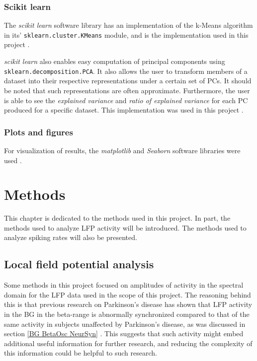 \documentclass{kththesis}
\begin{document}
\subsection{Scikit learn}\label{SK BG}

The \textit{scikit learn} software library has an implementation of the k-Means algorithm in its' \texttt{sklearn.cluster.KMeans} module, and is the implementation used in this project \parencite{SKLEARN}.

\textit{scikit learn} also enables easy computation of principal components using \texttt{sklearn.decomposition.PCA}.
It also allows the user to transform members of a dataset into their respective representations under a certain set of PCs. 
It should be noted that such representations are often approximate.
Furthermore, the user is able to see the \textit{explained variance} and \textit{ratio of explained variance} for each PC produced for a specific dataset. 
This implementation was used in this project \parencite{SKLEARN}.

\subsection{Plots and figures}

For visualization of results, the \textit{matplotlib} and \textit{Seaborn} software libraries were used \parencite{MPL} \parencite{Seaborn}.

\newpage
\chapter{Methods}

This chapter is dedicated to the methods used in this project.
In part, the methods used to analyze LFP activity will be introduced.
The methods used to analyze spiking rates will also be presented.

\section{Local field potential analysis}

Some methods in this project focused on amplitudes of activity in the spectral domain for the LFP data used in the scope of this project.
The reasoning behind this is that previous research on Parkinson's disease has shown that LFP activity in the BG in the beta-range is abnormally synchronized compared to that of the same activity in subjects unaffected by Parkinson's disease, as was discussed in section \ref{BG BetaOsc NeurSyn} \parencite{Cagnan}.
This suggests that such activity might embed additional useful information for further research, and reducing the complexity of this information could be helpful to such research. 
\end{document}
